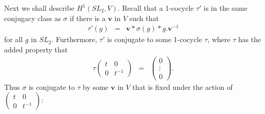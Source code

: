 Next we shall describe $H^1(SL_2, V)$. Recall that a 1-cocycle $\tau'$ is in the same conjugacy class as $\sigma$ if there is a $\mathbf{v}$ in $V$ such that
\begin{eqnarray*}
\tau'(g) &=& \mathbf{v}*\sigma(g)*g.\mathbf{v}^{-1}
\end{eqnarray*}
for all $g$ in $SL_2$. Furthermore, $\tau'$ is conjugate to some 1-cocycle $\tau$, where $\tau$ has the added property that
\begin{eqnarray*}
\tau\left(\begin{matrix}t & 0 \\ 0 & t^{-1}\end{matrix}\right) &=& \left(\begin{matrix} 0 \\ \vdots \\ 0\end{matrix}\right).
\end{eqnarray*}
Thus $\sigma$ is conjugate to $\tau$ by some $\mathbf{v}$ in $V$ that is fixed under the action of $\left(\begin{matrix}t & 0 \\ 0 & t^{-1}\end{matrix}\right)$:
